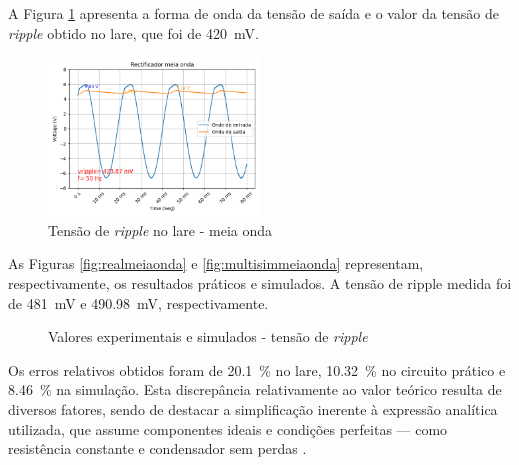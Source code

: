A Figura \ref{fig:ripplelaremeiaonda} apresenta a forma de onda da tensão de saída e o valor da tensão de \textit{ripple} obtido no \acrshort{lare}, que foi de \SI{420}{\milli\volt}.

\begin{figure}[hbtp]
	\centering
	\includegraphics[width=0.5\textwidth]{figures/ripple_lare_MO-2k2-100uF.png}
	\caption{Tensão de \textit{ripple} no \acrshort{lare} - meia onda}
	\label{fig:ripplelaremeiaonda}
\end{figure}

As Figuras \ref{fig:realmeiaonda} e \ref{fig:multisimmeiaonda} representam, respectivamente, os resultados práticos e simulados. A tensão de ripple medida foi de \SI{481}{\milli\volt} e \SI{490.98}{\milli\volt}, respectivamente.

\begin{figure}[hbtp]
	\centering%
		\centering
		\qquad
		\caption{Valores experimentais e simulados - tensão de \textit{ripple}}%
		\label{fig:simulacaoripple}%
	\end{figure}

Os erros relativos obtidos foram de \SI{20.1}{\percent} no \acrshort{lare}, \SI{10.32}{\percent} no circuito prático e \SI{8.46}{\percent} na simulação. Esta discrepância relativamente ao valor teórico resulta de diversos fatores, sendo de destacar a simplificação inerente à expressão analítica utilizada, que assume componentes ideais e condições perfeitas — como resistência constante e condensador sem perdas \cite{sedrasmith}.

